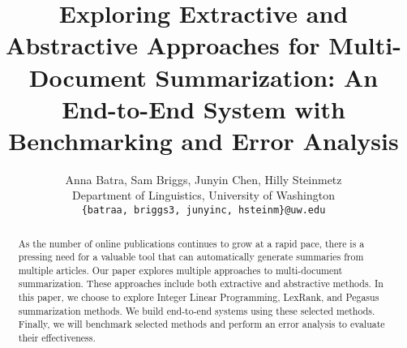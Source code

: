 \documentclass[11pt]{article}
\title{Exploring Extractive and Abstractive Approaches for Multi-Document Summarization: An End-to-End System with Benchmarking and Error Analysis}
\author{Anna Batra, Sam Briggs, Junyin Chen, Hilly Steinmetz\\
          Department of Linguistics, University of Washington \\
          \texttt{\{batraa, briggs3, junyinc, hsteinm\}@uw.edu}}
\begin{document}
\maketitle

\begin{abstract}
As the number of online publications continues to grow at a rapid pace, there is a pressing need for a valuable tool that can automatically generate summaries from multiple articles. Our paper explores multiple approaches to multi-document summarization. These approaches include both extractive and abstractive methods. In this paper, we choose to explore Integer Linear Programming, LexRank, and Pegasus summarization methods. We build end-to-end systems using these selected methods. Finally, we will benchmark selected methods and perform an error analysis to evaluate their effectiveness.
\end{abstract}



















\nocite{jurafsky-martin-draft, radev-etal-2000-centroid}


\end{document}
